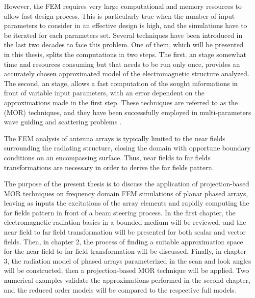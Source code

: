\par However, the FEM requires very large computational and memory resources to allow fast design process. This is particularly true when the number of input parameters to consider in an effective design is high, and the simulations have to be iterated for each parameters set. Several techniques have been introduced in the last two decades to face this problem. One of them, which will be presented in this thesis, splits the computations in two steps. The first, an  stage  somewhat time and resources consuming but that needs to be run only once, provides an accurately chosen approximated model of the electromagnetic structure analyzed. The second, an  stage, allows a fast computation of the sought informations in front of variable input parameters, with an error dependent on the approximations made in the first step. These techniques are referred to as the  (MOR) techniques, and they have been successfully employed in multi-parameters wave guiding and scattering problems \cite{SelleriEdlingerDDMOR,BertazziGhioneMOR, FarleMORFE, LedgerPerairePESSRIWA}.

\par The FEM analysis of antenna arrays is typically limited to the near fields surrounding the radiating structure, closing the domain with opportune boundary conditions on an encompassing surface. Thus, near fields to far fields transformations are necessary in order to derive the far fields pattern.

\par The purpose of the present thesis is to discuss the application of projection-based MOR techniques on frequency domain FEM simulations of planar phased arrays, leaving as inputs the excitations of the array elements and rapidly computing the far fields pattern in front of a beam steering process. In the first chapter, the electromagnetic radiation basics in a bounded medium will be reviewed, and the near field to far field transformation will be presented for both scalar and vector fields. Then, in chapter 2, the process of finding a suitable approximation space for the near field to far field transformation will be discussed. Finally, in chapter 3, the radiation model of phased arrays parameterized in the scan and look angles will be constructed, then a projection-based MOR technique will be applied. Two numerical examples validate the approximations performed in the second chapter, and the reduced order models will be compared to the respective full models.

\pagestyle{headings}
\renewcommand\thefigure{\thechapter.\arabic{figure}}
